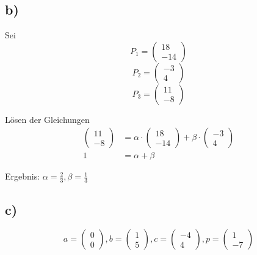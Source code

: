 \documentclass{article}
\begin{document}
\subsection*{b)}
Sei \[ P_1=
    \begin{pmatrix}
        18 \\-14
    \end{pmatrix}\]
\[ P_2=
    \begin{pmatrix}
        -3 \\4
    \end{pmatrix}\]
\[ P_3=
    \begin{pmatrix}
        11 \\-8
    \end{pmatrix}\]

Lösen der Gleichungen
\[
    \begin{aligned}
        \begin{pmatrix}
            11 \\ -8
        \end{pmatrix} & = \alpha \cdot 
        \begin{pmatrix}
            18 \\ -14
        \end{pmatrix} + \beta \cdot 
        \begin{pmatrix}
            -3 \\ 4 
        \end{pmatrix} \\
        1 & = \alpha + \beta
    \end{aligned}
\]

Ergebnis: $\alpha = \frac23, \beta = \frac13$

\subsection*{c)}
\[
    a = \begin{pmatrix}
        0 \\ 0
    \end{pmatrix},
    b = \begin{pmatrix}
        1 \\ 5
    \end{pmatrix},
    c = \begin{pmatrix}
        -4 \\ 4
    \end{pmatrix},
    p = \begin{pmatrix}
        1 \\ -7
    \end{pmatrix}
\]
\end{document}

